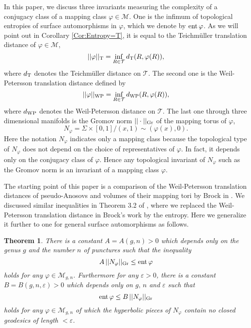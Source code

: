 \documentclass[11pt,reqno]{amsart}
\newtheorem{theorem}{{\bf Theorem}}
\numberwithin{equation}{section}
\begin{document}
In this paper, 
we discuss three invariants measuring the complexity of  
a conjugacy class of a mapping class  $\varphi \in \mathcal{M}$.  
One is the infimum of topological entropies of 
surface automorphisms in  $\varphi$,   
which we denote by  ${\rm ent} \, \varphi$.    
As we will point out in Corollary \ref{Cor:Entropy=T}, 
it is equal to the Teichm\"uller translation distance 
of  $\varphi \in \mathcal{M}$, 
\begin{equation*}
	|| \varphi ||_{\rm T} = \inf_{R \in \mathcal{T}} d_{\rm T}(R, \varphi(R)),     
\end{equation*}
where  $d_{\rm T}$  denotes the Teichm\"uller distance on  $\mathcal{T}$.  
The second one is the Weil-Petersson translation distance defined by 
\begin{equation*}
	|| \varphi ||_{\rm WP} = \inf_{R \in \mathcal{T}} d_{\rm WP}(R, \varphi(R)),     
\end{equation*}
where  $d_{\rm WP}$  denotes the Weil-Petersson distance on  $\mathcal{T}$.  
The last one through three dimensional manifolds is 
the Gromov norm   $|| \cdot ||_{{\rm Gr}}$  of 
the mapping torus of  $\varphi$, 
\begin{equation*} 
	N_{\varphi} =\varSigma \times [0,1]/ (x, 1) \sim (\varphi(x), 0).  
\end{equation*} 
Here the notation  $N_{\varphi}$  indicates only a mapping class because 
the topological type of  $N_{\varphi}$  
does not depend on the choice of representatives of  $\varphi$.  
In fact, 
it depends only on the conjugacy class of  $\varphi$.  
Hence any topological invariant of  $N_{\varphi}$  such as 
the Gromov norm is an 
invariant of a mapping class  $\varphi$.  

The starting point of this paper is a comparison of 
the Weil-Petersson translation distances of pseudo-Anosovs and 
volumes of their mapping tori by Brock in \cite{Brock}.  
We discussed similar inequalities in Theorem 3.2 of  \cite{KKT}, 
where we replaced the Weil-Petersson translation distance in 
Brock's work by the entropy.  
Here we generalize it further to one for general surface automorphisms  
as follows. 

\begin{theorem}\label{Thm:1} 
There is a constant  $A = A(g, n) > 0$  which depends only on 
the genus  $g$  and the number  $n$  of punctures  
such that the inequality 
\begin{equation*}
	A \, || N_{\varphi} ||_{{\rm Gr}} \leq {\rm ent} \, \varphi 
\end{equation*} 
holds for any  $\varphi \in \mathcal{M}_{g,n}$.  
Furthermore for any  $\varepsilon > 0$,  
there is a constant  $B = B(g, n, \varepsilon) > 0$  which 
depends only on  $g, \, n$  and  $\varepsilon$  such that 
\begin{equation*} 
	{\rm ent} \, \varphi \leq B \, || N_{\varphi} ||_{{\rm Gr}}  
\end{equation*} 
holds for any  $\varphi \in \mathcal{M}_{g,n}$  of which the hyperbolic pieces of 
$N_{\varphi}$  contain no closed geodesics of length  $< \varepsilon$.  
\end{theorem}  
\end{document}

